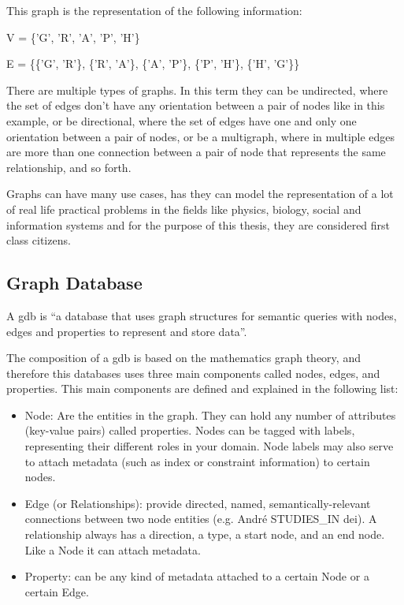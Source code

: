 This graph is the representation of the following information:

V = \{'G', 'R', 'A', 'P', 'H'\}

E = \{\{'G', 'R'\}, \{'R', 'A'\}, \{'A', 'P'\}, \{'P', 'H'\}, \{'H', 'G'\}\}

There are multiple types of graphs. In this term they can be undirected, where the set of edges don't have any orientation between a pair of nodes like in this example, or be directional, where the set of edges have one and only one orientation between a pair of nodes, or be a multigraph, where in multiple edges are more than one connection between a pair of node that represents the same relationship, and so forth.

Graphs can have many use cases, has they can model the representation of a lot of real life practical problems in the fields like physics, biology, social and information systems and for the purpose of this thesis, they are considered first class citizens.

\subsection{Graph Database}
\label{subsec:graph_database}

A \gls{gdb} is ``a database that uses graph structures for semantic queries with nodes, edges and properties to represent and store data''\cite{graph_database_definition}.

The composition of a \gls{gdb} is based on the mathematics graph theory, and therefore this databases uses three main components called nodes, edges, and properties. This main components are defined and explained in the following list:

\begin{itemize}
    \item Node: Are the entities in the graph. They can hold any number of attributes (key-value pairs) called properties. Nodes can be tagged with labels, representing their different roles in your domain. Node labels may also serve to attach metadata (such as index or constraint information) to certain nodes.
    \item Edge (or Relationships): provide directed, named, semantically-relevant connections between two node entities (e.g. André STUDIES\_IN \gls{dei}). A relationship always has a direction, a type, a start node, and an end node. Like a Node it can attach metadata. 
    \item Property: can be any kind of metadata attached to a certain Node or a certain Edge.
\end{itemize}

